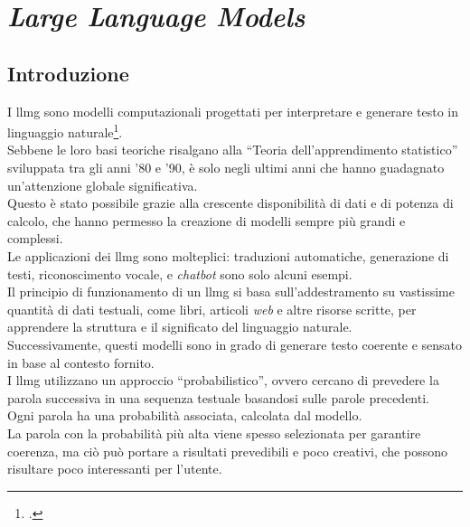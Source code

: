 \pagebreak
\section{\textit{Large Language Models}}
\label{sez:llm}

\subsection{Introduzione}
\label{subsec:llm-introduzione}

I \gls{llmg} sono modelli computazionali progettati per interpretare e generare testo in linguaggio naturale\footcite{site:introduction-llm}.\\
Sebbene le loro basi teoriche risalgano alla ``Teoria dell'apprendimento statistico'' sviluppata tra gli anni '80 e '90, è solo negli ultimi anni che hanno guadagnato un'attenzione globale significativa. \\
Questo è stato possibile grazie alla crescente disponibilità di dati e di potenza di calcolo, che hanno permesso la creazione di modelli sempre più grandi e complessi.\\
Le applicazioni dei \gls{llmg} sono molteplici: traduzioni automatiche, generazione di testi, riconoscimento vocale, e \textit{chatbot} sono solo alcuni esempi.\\

\noindent Il principio di funzionamento di un \gls{llmg} si basa sull'addestramento su vastissime quantità di dati testuali, come libri, articoli \textit{web} e altre risorse scritte, 
per apprendere la struttura e il significato del linguaggio naturale.\\
Successivamente, questi modelli sono in grado di generare testo coerente e sensato in base al contesto fornito.\\

\noindent I \gls{llmg} utilizzano un approccio ``probabilistico'', ovvero cercano di prevedere la parola successiva in una sequenza testuale basandosi sulle parole precedenti.\\
Ogni parola ha una probabilità associata, calcolata dal modello. \\
La parola con la probabilità più alta viene spesso selezionata per garantire coerenza, ma ciò può portare a risultati prevedibili e poco creativi, che possono risultare poco interessanti per l'utente.\\

